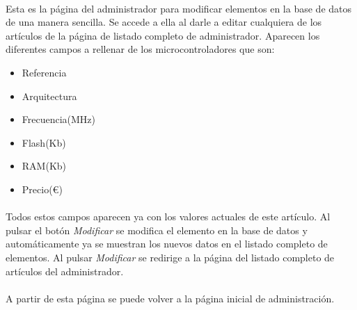 \paragraph{} Esta es la página del administrador para modificar elementos en la base de datos de una manera sencilla. Se accede a ella al darle a editar cualquiera de los artículos de la página de listado completo de administrador. Aparecen los diferentes campos a rellenar de los microcontroladores que son:
\begin{itemize}
\item Referencia
\item Arquitectura
\item Frecuencia(MHz) 
\item Flash(Kb)
\item RAM(Kb) 
\item Precio($\euro$)
\end{itemize}

\paragraph{} Todos estos campos aparecen ya con los valores actuales de este artículo. Al pulsar el botón \textit{Modificar} se modifica el elemento en la base de datos y automáticamente ya se muestran los nuevos datos en el listado completo de elementos. Al pulsar \textit{Modificar} se redirige a la página del listado completo de artículos del administrador.

\paragraph{} A partir de esta página se puede volver a la página inicial de administración.